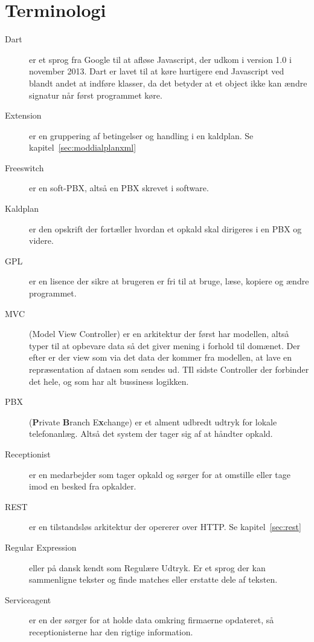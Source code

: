 \chapter*{Terminologi}


\begin{description}
	\item[Dart] er et sprog fra Google til at afløse Javascript, der udkom i version 1.0 i november 2013. Dart er lavet til at køre hurtigere end Javascript ved blandt andet at indføre klasser, da det betyder at et object ikke kan ændre signatur når først programmet køre\citep{walrath2012dart}.
	
	\item[Extension] er en gruppering af betingelser og handling i en kaldplan. Se kapitel~\ref{sec:moddialplanxml}
	
	\item[Freeswitch] er en soft-PBX, altså en PBX skrevet i software.
	
	\item[Kaldplan] er den opskrift der fortæller hvordan et opkald skal dirigeres i en PBX og videre.
	
	\item[GPL] er en lisence der sikre at brugeren er fri til at bruge, læse, kopiere og ændre programmet.	
	
	\item[MVC] (Model View Controller) er en arkitektur der først har modellen, altså typer til at opbevare data så det giver mening i forhold til domænet. Der efter er der view som via det data der kommer fra modellen, at lave en repræsentation af dataen som sendes ud. TIl sidste Controller der forbinder det hele, og som har alt bussiness logikken.
	
	\item[PBX] (\textbf{P}rivate \textbf{B}ranch E\textbf{x}change) er et alment udbredt udtryk for lokale telefonanlæg. Altså det system der tager sig af at håndter opkald.
	
	\item[Receptionist] er en medarbejder som tager opkald og sørger for at omstille eller tage imod en besked fra opkalder.
	
	\item[REST] er en tilstandsløs arkitektur der opererer over HTTP. Se kapitel~\ref{sec:rest}
	
	\item[Regular Expression] eller på dansk kendt som Regulære Udtryk. Er et sprog der kan sammenligne tekster og finde matches eller erstatte dele af teksten.
	
	\item[Serviceagent] er en der sørger for at holde data omkring firmaerne opdateret, så receptionisterne har den rigtige information.
\end{description} 
